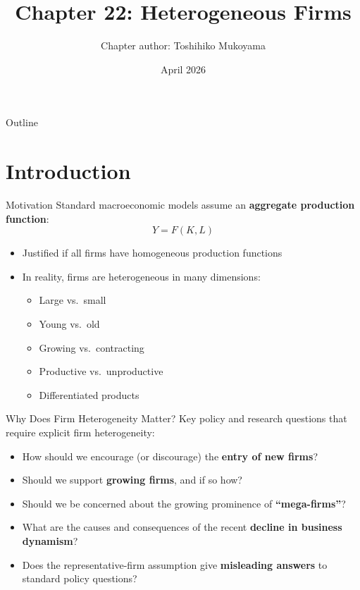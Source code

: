 \documentclass[blue]{beamer}
\title[Chapter22]{Chapter 22: Heterogeneous Firms}
\author[Toshihiko Mukoyama]{Chapter author: Toshihiko Mukoyama}
\date[April 2026]{April 2026}
\begin{document}
  \frame
  {
    \titlepage
  }


\begin{frame}{Outline}
	\tableofcontents
\end{frame}

\section{Introduction}

\begin{frame}{Motivation}
	Standard macroeconomic models assume an \textbf{aggregate production function}:
	\[
	Y = F(K, L)
	\]
	\begin{itemize}
		\item Justified if all firms have homogeneous production functions
		\item In reality, firms are heterogeneous in many dimensions:
		\begin{itemize}
			\item Large vs.\ small
			\item Young vs.\ old
			\item Growing vs.\ contracting
			\item Productive vs.\ unproductive
			\item Differentiated products
		\end{itemize}
	\end{itemize}
\end{frame}

\begin{frame}{Why Does Firm Heterogeneity Matter?}
	Key policy and research questions that require explicit firm heterogeneity:
	\begin{itemize}
		\item How should we encourage (or discourage) the \textbf{entry of new firms}?
		\item Should we support \textbf{growing firms}, and if so how?
		\item Should we be concerned about the growing prominence of \textbf{``mega-firms''}?
		\item What are the causes and consequences of the recent \textbf{decline in business dynamism}?
		\item Does the representative-firm assumption give \textbf{misleading answers} to standard policy questions?
	\end{itemize}
\end{frame}
\end{document}
